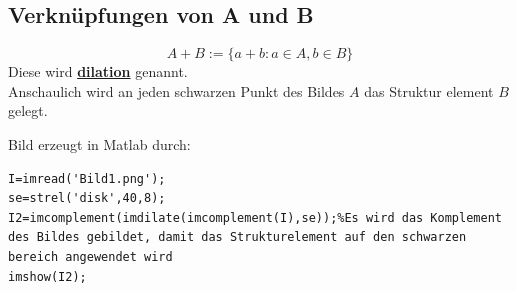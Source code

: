 \documentclass{article}
\theoremstyle{plain}
\theoremstyle{definition}
\numberwithin{equation}{section}
\newcommand{\mim}[1] {
\underline{\textbf{#1\index{#1}}}
}
\begin{document}
    \subsection{Verknüpfungen von A und B}
        \[A+B := \{a + b : a \in A, b \in B\}\]
        Diese wird \mim{dilation} genannt.\\
        Anschaulich wird an jeden schwarzen Punkt des Bildes $A$ das Struktur element $B$ gelegt.
        \begin{center}
        \end{center}
        Bild erzeugt in Matlab durch:\\
        \begin{lstlisting}
I=imread('Bild1.png');
se=strel('disk',40,8);
I2=imcomplement(imdilate(imcomplement(I),se));%Es wird das Komplement des Bildes gebildet, damit das Strukturelement auf den schwarzen bereich angewendet wird
imshow(I2);
        \end{lstlisting}
\end{document}
